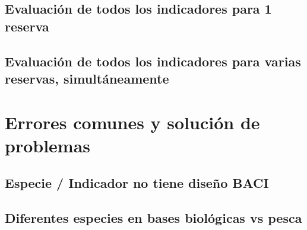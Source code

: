 \documentclass[]{book}
\begin{document}
\hypertarget{evaluacion-de-todos-los-indicadores-para-1-reserva}{%
\section{Evaluación de todos los indicadores para 1
reserva}\label{evaluacion-de-todos-los-indicadores-para-1-reserva}}

\hypertarget{evaluacion-de-todos-los-indicadores-para-varias-reservas-simultaneamente}{%
\section{Evaluación de todos los indicadores para varias reservas,
simultáneamente}\label{evaluacion-de-todos-los-indicadores-para-varias-reservas-simultaneamente}}

\hypertarget{errores-comunes-y-solucion-de-problemas}{%
\chapter{Errores comunes y solución de
problemas}\label{errores-comunes-y-solucion-de-problemas}}

\hypertarget{especie-indicador-no-tiene-diseno-baci}{%
\section{Especie / Indicador no tiene diseño
BACI}\label{especie-indicador-no-tiene-diseno-baci}}

\hypertarget{diferentes-especies-en-bases-biologicas-vs-pesca}{%
\section{Diferentes especies en bases biológicas vs
pesca}\label{diferentes-especies-en-bases-biologicas-vs-pesca}}


\end{document}
